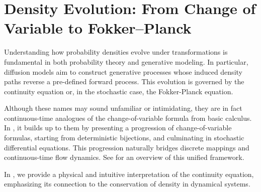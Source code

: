 \chapter{Density Evolution: From Change of Variable to Fokker–Planck}\label{app:continuity}

Understanding how probability densities evolve under transformations is fundamental in both probability theory and generative modeling. In particular, diffusion models aim to construct generative processes whose induced density paths reverse a pre-defined forward process. This evolution is governed by the continuity equation or, in the stochastic case, the Fokker-Planck equation.

Although these names may sound unfamiliar or intimidating, they are in fact continuous-time analogues of the change-of-variable formula from basic calculus. In , it builds up to them by presenting a progression of change-of-variable formulas, starting from deterministic bijections, and culminating in stochastic differential equations. This progression naturally bridges discrete mappings and continuous-time flow dynamics. See  for an overview of this unified framework.

In , we provide a physical and intuitive interpretation of the continuity equation, emphasizing its connection to the conservation of density in dynamical systems.


